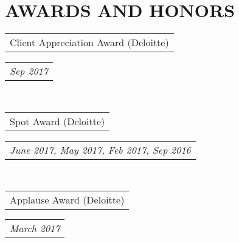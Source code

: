 \documentclass[11.5pt,a4paper,roman]{moderncv}        %
\makeatletter
\newcommand*{\customcvproject}[4][.25em]{
  \begin{tabular}{@{}l} 
    {\bfseries #2}
  \end{tabular}
  \hfill%
  \begin{tabular}{l@{}}
     {\itshape #3}
  \end{tabular}
  \ifx&#4&%
  \else{\\%
    \begin{minipage}{\maincolumnwidth}%
      \small#4%
    \end{minipage}}\fi%
 \par}
\newcommand*{\customcvaward}[4][.25em]{
  \begin{tabular}{@{}l} 
   {\normalfont #2}
  \end{tabular}
  \hfill%
  \begin{tabular}{l@{}}
     {\itshape #3}
  \end{tabular}
   }
\makeatother
\begin{document}
\section{\large AWARDS AND HONORS}

 \vspace{-2mm} 
{\customcvaward{Client Appreciation Award \normalfont(Deloitte)}  {Sep 2017}\\}\\
{\customcvaward{Spot Award \normalfont(Deloitte) }{June 2017, May 2017, Feb 2017, Sep 2016}\\}\\
{\customcvaward{Applause Award \normalfont(Deloitte)}{March 2017}\\}\\
  
  
%
\end{document}

